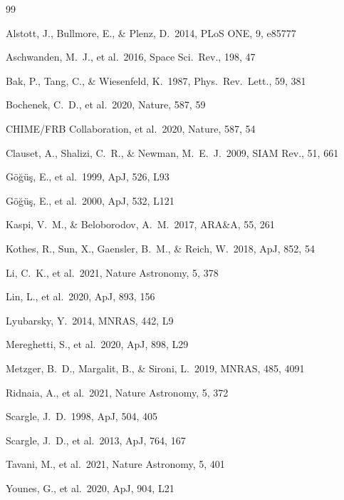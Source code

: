 \documentclass[12pt]{article}
\begin{document}
\begin{thebibliography}{99}

Alstott, J., Bullmore, E., \& Plenz, D.\ 2014, PLoS ONE, 9, e85777

Aschwanden, M.~J., et al.\ 2016, Space Sci.\ Rev., 198, 47

Bak, P., Tang, C., \& Wiesenfeld, K.\ 1987, Phys.\ Rev.\ Lett., 59, 381

Bochenek, C.~D., et al.\ 2020, Nature, 587, 59

CHIME/FRB Collaboration, et al.\ 2020, Nature, 587, 54

Clauset, A., Shalizi, C.~R., \& Newman, M.~E.~J.\ 2009, SIAM Rev., 51, 661

G{\"o}{\u{g}}{\"u}{\c{s}}, E., et al.\ 1999, ApJ, 526, L93

G{\"o}{\u{g}}{\"u}{\c{s}}, E., et al.\ 2000, ApJ, 532, L121

Kaspi, V.~M., \& Beloborodov, A.~M.\ 2017, ARA\&A, 55, 261

Kothes, R., Sun, X., Gaensler, B.~M., \& Reich, W.\ 2018, ApJ, 852, 54

Li, C.~K., et al.\ 2021, Nature Astronomy, 5, 378

Lin, L., et al.\ 2020, ApJ, 893, 156

Lyubarsky, Y.\ 2014, MNRAS, 442, L9

Mereghetti, S., et al.\ 2020, ApJ, 898, L29

Metzger, B.~D., Margalit, B., \& Sironi, L.\ 2019, MNRAS, 485, 4091

Ridnaia, A., et al.\ 2021, Nature Astronomy, 5, 372

Scargle, J.~D.\ 1998, ApJ, 504, 405

Scargle, J.~D., et al.\ 2013, ApJ, 764, 167

Tavani, M., et al.\ 2021, Nature Astronomy, 5, 401

Younes, G., et al.\ 2020, ApJ, 904, L21

\end{thebibliography}
\end{document}
